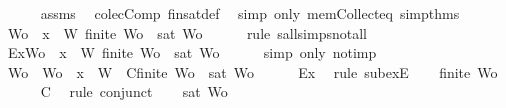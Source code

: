 \begin{isabellebody}
\ \ \ \ \isamarkupfalse%
\ assms{\isacharparenleft}{}{\isacharparenright}\ \isamarkupfalse%
\ colecComp\ fin{\isacharunderscore}sat{\isacharunderscore}def\ \isamarkupfalse%
\ {\isacharparenleft}simp\ only{\isacharcolon}\ mem{\isacharunderscore}Collect{\isacharunderscore}eq\ simp{\isacharunderscore}thms{\isacharparenleft}{}{\isacharparenright}{\isacharparenright}\isanewline
\ \ \isamarkupfalse%
\ \isamarkupfalse%
\ {\isachardoublequoteopen}{\isasymexists}Wo\ {\isasymsubseteq}\ {\isacharbraceleft}x{\isacharbraceright}\ {\isasymunion}\ W{\isachardot}\ {\isasymnot}{\isacharparenleft}finite\ Wo\ {\isasymlongrightarrow}\ sat\ Wo{\isacharparenright}{\isachardoublequoteclose}\isanewline
\ \ \ \ \isamarkupfalse%
\ {\isacharparenleft}rule\ sall{\isacharunderscore}simps{\isacharunderscore}not{\isacharunderscore}all{\isacharparenright}\isanewline
\ \ \isamarkupfalse%
\ \isamarkupfalse%
\ Ex{}{\isacharcolon}{\isachardoublequoteopen}{\isasymexists}Wo\ {\isasymsubseteq}\ {\isacharbraceleft}x{\isacharbraceright}\ {\isasymunion}\ W{\isachardot}\ finite\ Wo\ {\isasymand}\ {\isasymnot}{\isacharparenleft}sat\ Wo{\isacharparenright}{\isachardoublequoteclose}\isanewline
\ \ \ \ \isamarkupfalse%
\ {\isacharparenleft}simp\ only{\isacharcolon}\ not{\isacharunderscore}imp{\isacharparenright}\isanewline
\ \ \isamarkupfalse%
\ Wo{\isacharprime}\ \ {\isachardoublequoteopen}Wo{\isacharprime}\ {\isasymsubseteq}\ {\isacharbraceleft}x{\isacharbraceright}\ {\isasymunion}\ W{\isachardoublequoteclose}\ \ C{}{\isacharcolon}{\isachardoublequoteopen}finite\ Wo{\isacharprime}\ {\isasymand}\ {\isasymnot}{\isacharparenleft}sat\ Wo{\isacharprime}{\isacharparenright}{\isachardoublequoteclose}\isanewline
\ \ \ \ \isamarkupfalse%
\ Ex{}\ \isamarkupfalse%
\ {\isacharparenleft}rule\ subexE{\isacharparenright}\isanewline
\ \ \isamarkupfalse%
\ {\isachardoublequoteopen}finite\ Wo{\isacharprime}{\isachardoublequoteclose}\isanewline
\ \ \ \ \isamarkupfalse%
\ C{}\ \isamarkupfalse%
\ {\isacharparenleft}rule\ conjunct{}{\isacharparenright}\isanewline
\ \ \isamarkupfalse%
\ {\isachardoublequoteopen}{\isasymnot}{\isacharparenleft}sat\ Wo{\isacharprime}{\isacharparenright}{\isachardoublequoteclose}\isanewline
\ \ \ \ \isamarkupfalse%

\end{isabellebody}
